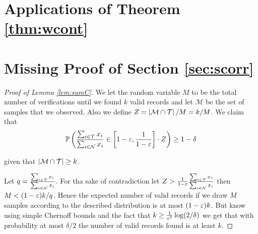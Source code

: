 \section{Applications of Theorem \ref{thm:wcont}}







\section{Missing Proof of Section \ref{sec:scorr}} \label{sec:app:scorr}

\begin{proof}[Proof of Lemma \ref{lem:sumC}]
  We let the random variable $M$ to be the total number of verifications until we found $k$ valid records and let $\mathcal{M}$ be the set of samples that we observed. Also we define 
$Z = \left|\mathcal{M} \cap \mathcal{T}\right|/M = k/M$. We claim that
\[ \mathbb{P}\left(\frac{\sum_{i \in \mathcal{T}} x_i}{\sum_{i \in \mathcal{N}} x_i} \in \left[ 1 - \varepsilon, \frac{1}{1 - \varepsilon} \right] \cdot Z \right) \ge 1 - \delta \]

\noindent given that $\left|\mathcal{M} \cap \mathcal{T}\right| \ge k$.

  Let $q = \frac{\sum_{i \in \mathcal{T}} x_i}{\sum_{i \in \mathcal{N}} x_i}$. For tha sake of contradiction let $Z > \frac{1}{1 - \varepsilon} \frac{\sum_{i \in \mathcal{T}} x_i}{\sum_{i \in \mathcal{N}} x_i}$ then 
$M < (1 - \varepsilon) k / q$. Hence the expected number of valid records if we draw $M$ samples according to the described distribution is at most $(1 - \varepsilon) k$. But know using simple Chernoff 
bounds and the fact that $k \ge \frac{1}{\varepsilon^2}\log (2/\delta)$ we get that with probability at most $\delta / 2$ the number of valid records found is at least $k$. 


\end{proof}
